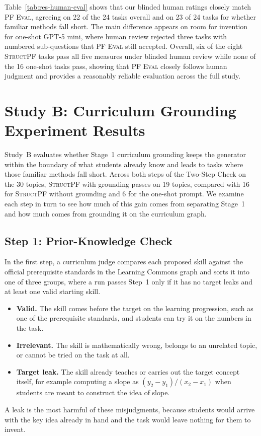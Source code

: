Table~\ref{tab:res-human-eval} shows that our blinded human ratings closely match \textsc{PF Eval}, agreeing on 22 of the 24 tasks overall and on 23 of 24 tasks for whether familiar methods fall short. The main difference appears on room for invention for one-shot GPT-5 mini, where human review rejected three tasks with numbered sub-questions that \textsc{PF Eval} still accepted. Overall, six of the eight \textsc{StructPF} tasks pass all five measures under blinded human review while none of the 16 one-shot tasks pass, showing that \textsc{PF Eval} closely follows human judgment and provides a reasonably reliable evaluation across the full study.

\section{Study B: Curriculum Grounding Experiment Results}
\label{sec:res-grounding}

Study~B evaluates whether Stage~1 curriculum grounding keeps the generator within the boundary of what students already know and leads to tasks where those familiar methods fall short. Across both steps of the Two-Step Check on the 30 topics, \textsc{StructPF} with grounding passes on 19 topics, compared with 16 for \textsc{StructPF} without grounding and 6 for the one-shot prompt. We examine each step in turn to see how much of this gain comes from separating Stage~1 and how much comes from grounding it on the curriculum graph.

\subsection{Step 1: Prior-Knowledge Check}
\label{subsec:res-gate1}

In the first step, a curriculum judge compares each proposed skill against the official prerequisite standards in the Learning Commons graph and sorts it into one of three groups, where a run passes Step~1 only if it has no target leaks and at least one valid starting skill.
\begin{itemize}
    \item \textbf{Valid.} The skill comes before the target on the learning progression, such as one of the prerequisite standards, and students can try it on the numbers in the task.
    \item \textbf{Irrelevant.} The skill is mathematically wrong, belongs to an unrelated topic, or cannot be tried on the task at all.
    \item \textbf{Target leak.} The skill already teaches or carries out the target concept itself, for example computing a slope as $(y_2 - y_1)/(x_2 - x_1)$ when students are meant to construct the idea of slope.
\end{itemize}
A leak is the most harmful of these misjudgments, because students would arrive with the key idea already in hand and the task would leave nothing for them to invent.

